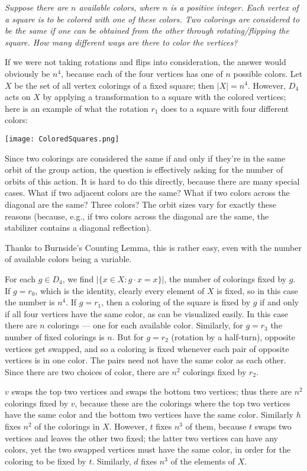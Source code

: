 \documentclass[leqno]{book}
\begin{document}
\emph{Suppose there are $n$ available colors, where $n$ is a positive integer.  Each vertex of a square is to be colored with one of these colors.  Two colorings are considered to be the same if one can be obtained from the other through rotating/flipping the square.  How many different ways are there to color the vertices?}

If we were not taking rotations and flips into consideration, the answer would obviously be $n^4$, because each of the four vertices has one of $n$ possible colors.  Let $X$ be the set of all vertex colorings of a fixed square; then $|X|=n^4$.  However, $D_4$ acts on $X$ by applying a transformation to a square with the colored vertices; here is an example of what the rotation $r_1$ does to a square with four different colors:
\begin{center}\texttt{[image: ColoredSquares.png]}\end{center}
Since two colorings are considered the same if and only if they're in the same orbit of the group action, the question is effectively asking for the number of orbits of this action.  It is hard to do this directly, because there are many special cases.  What if two adjacent colors are the same?  What if two colors across the diagonal are the same?  Three colors?  The orbit sizes vary for exactly these reasons (because, e.g., if two colors across the diagonal are the same, the stabilizer contains a diagonal reflection).

Thanks to Burnside's Counting Lemma, this is rather easy, even with the number of available colors being a variable.

For each $g\in D_4$, we find $|\{x\in X:g\cdot x=x\}|$, the number of colorings fixed by $g$.  If $g=r_0$, which is the identity, clearly every element of $X$ is fixed, so in this case the number is $n^4$.  If $g=r_1$, then a coloring of the square is fixed by $g$ if and only if all four vertices have the same color, as can be visualized easily.  In this case there are $n$ colorings \---- one for each available color.  Similarly, for $g=r_3$ the number of fixed colorings is $n$.  But for $g=r_2$ (rotation by a half-turn), opposite vertices get swapped, and so a coloring is fixed whenever each pair of opposite vertices is in one color.  The pairs need not have the same color as each other.  Since there are two choices of color, there are $n^2$ colorings fixed by $r_2$.

$v$ swaps the top two vertices and swaps the bottom two vertices; thus there are $n^2$ colorings fixed by $v$, because these are the colorings where the top two vertices have the same color and the bottom two vertices have the same color.  Similarly $h$ fixes $n^2$ of the colorings in $X$.  However, $t$ fixes $n^3$ of them, because $t$ swaps two vertices and leaves the other two fixed; the latter two vertices can have any colors, yet the two swapped vertices must have the same color, in order for the coloring to be fixed by $t$.  Similarly, $d$ fixes $n^3$ of the elements of $X$.
\end{document}

